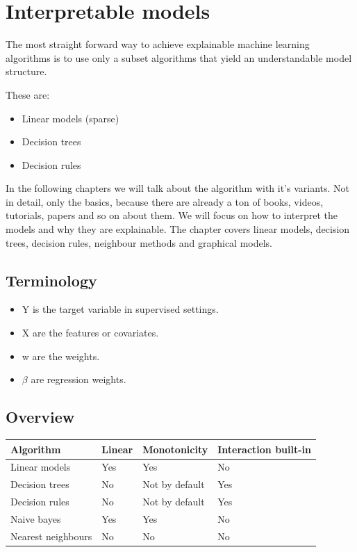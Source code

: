 \documentclass[12pt,]{krantz}
\providecommand{\tightlist}{%
  \setlength{\itemsep}{0pt}\setlength{\parskip}{0pt}}
\theoremstyle{definition}
\theoremstyle{definition}
\theoremstyle{definition}
\theoremstyle{remark}
\begin{document}
\chapter{Interpretable models}\label{simple}

The most straight forward way to achieve explainable machine learning
algorithms is to use only a subset algorithms that yield an
understandable model structure.

These are:

\begin{itemize}
\tightlist
\item
  Linear models (sparse)
\item
  Decision trees
\item
  Decision rules
\end{itemize}

In the following chapters we will talk about the algorithm with it's
variants. Not in detail, only the basics, because there are already a
ton of books, videos, tutorials, papers and so on about them. We will
focus on how to interpret the models and why they are explainable. The
chapter covers linear models, decision trees, decision rules, neighbour
methods and graphical models.

\section{Terminology}\label{terminology}

\begin{itemize}
\tightlist
\item
  Y is the target variable in supervised settings.
\item
  X are the features or covariates.
\item
  w are the weights.
\item
  \(\beta\) are regression weights.
\end{itemize}

\section{Overview}\label{overview}

\begin{longtable}[]{@{}llll@{}}
\toprule
Algorithm & Linear & Monotonicity & Interaction built-in\tabularnewline
\midrule
\endhead
Linear models & Yes & Yes & No\tabularnewline
Decision trees & No & Not by default & Yes\tabularnewline
Decision rules & No & Not by default & Yes\tabularnewline
Naive bayes & Yes & Yes & No\tabularnewline
Nearest neighbours & No & No & No\tabularnewline
\bottomrule
\end{longtable}
\end{document}
